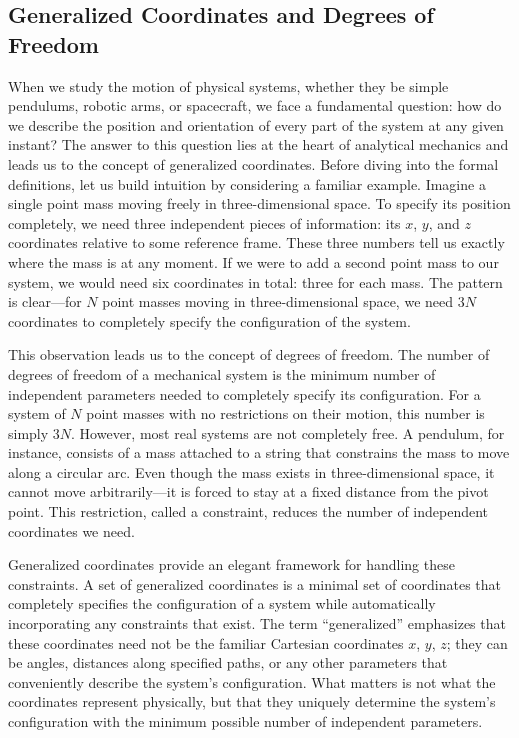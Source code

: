 \subsection{Generalized Coordinates and Degrees of Freedom}

When we study the motion of physical systems, whether they be simple pendulums, robotic arms, or spacecraft, we face a fundamental question: how do we describe the position and orientation of every part of the system at any given instant? The answer to this question lies at the heart of analytical mechanics and leads us to the concept of generalized coordinates. Before diving into the formal definitions, let us build intuition by considering a familiar example. Imagine a single point mass moving freely in three-dimensional space. To specify its position completely, we need three independent pieces of information: its $x$, $y$, and $z$ coordinates relative to some reference frame. These three numbers tell us exactly where the mass is at any moment. If we were to add a second point mass to our system, we would need six coordinates in total: three for each mass. The pattern is clear—for $N$ point masses moving in three-dimensional space, we need $3N$ coordinates to completely specify the configuration of the system.

This observation leads us to the concept of degrees of freedom. The number of degrees of freedom of a mechanical system is the minimum number of independent parameters needed to completely specify its configuration. For a system of $N$ point masses with no restrictions on their motion, this number is simply $3N$. However, most real systems are not completely free. A pendulum, for instance, consists of a mass attached to a string that constrains the mass to move along a circular arc. Even though the mass exists in three-dimensional space, it cannot move arbitrarily—it is forced to stay at a fixed distance from the pivot point. This restriction, called a constraint, reduces the number of independent coordinates we need.

Generalized coordinates provide an elegant framework for handling these constraints. A set of generalized coordinates is a minimal set of coordinates that completely specifies the configuration of a system while automatically incorporating any constraints that exist. The term ``generalized'' emphasizes that these coordinates need not be the familiar Cartesian coordinates $x$, $y$, $z$; they can be angles, distances along specified paths, or any other parameters that conveniently describe the system's configuration. What matters is not what the coordinates represent physically, but that they uniquely determine the system's configuration with the minimum possible number of independent parameters.

